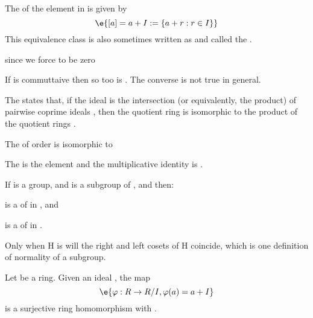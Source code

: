 \begin{R} The  of the element  in  is given by
$$\e{[a] = a + I := \{ a + r : r \in I \}}$$
This equivalence class is also sometimes written as  and called the .
\end{R}

\begin{R}  since we force  to be zero \end{R}

\begin{R} If  is commuttaive then so too is . The converse is not true in general. \end{R}

\begin{R} The  states that, if the ideal  is the intersection (or equivalently, the product) of pairwise coprime ideals , then the quotient ring  is isomorphic to the product of the quotient rings . \end{R}

\begin{Le} The  of order  is isomorphic to  \end{Le}

\begin{R} The  is the element  and the multiplicative identity is . \end{R}

\begin{D} If  is a group, and  is a subgroup of , and  then:
\begin{compactitem}
\item {} is a  of  in , and
\item {} is a  of  in .
\end{compactitem}
Only when H is  will the right and left cosets of H coincide, which is one definition of normality of a subgroup.
\end{D}



\begin{Le} Let  be a ring. Given an ideal , the  map 
$$\e{\varphi : R\to R/I, \varphi(a)=a+I}$$
is a surjective ring homomorphism with . \end{Le}

